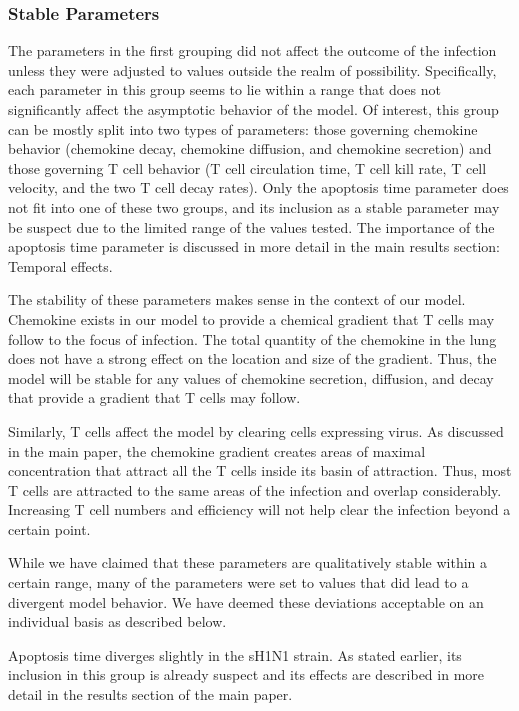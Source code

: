 \documentclass[10pt]{article}
\begin{document}
\subsubsection{Stable Parameters}

The parameters in the first grouping did not affect the outcome of the infection unless they were adjusted to values outside the realm of possibility.  Specifically, each parameter in this group seems to lie within a range that does not significantly affect the asymptotic behavior of the model.  Of interest, this group can be mostly split into two types of parameters: those governing chemokine behavior (chemokine decay, chemokine diffusion, and chemokine secretion) and those governing T cell behavior (T cell circulation time, T cell kill rate, T cell velocity, and the two T cell decay rates).  Only the apoptosis time parameter does not fit into one of these two groups, and its inclusion as a stable parameter may be suspect due to the limited range of the values tested.  The importance of the apoptosis time parameter is discussed in more detail in the main results section: Temporal effects.  

The stability of these parameters makes sense in the context of our model.  Chemokine exists in our model to provide a chemical gradient that T cells may follow to the focus of infection.  The total quantity of the chemokine in the lung does not have a strong effect on the location and size of the gradient.  Thus, the model will be stable for any values of chemokine secretion, diffusion, and decay that provide a gradient that T cells may follow.

Similarly, T cells affect the model by clearing cells expressing virus.  As discussed in the main paper, the chemokine gradient creates areas of maximal concentration that attract all the T cells inside its basin of attraction.  Thus, most T cells are attracted to the same areas of the infection and overlap considerably.  Increasing T cell numbers and efficiency will not help clear the infection beyond a certain point.

While we have claimed that these parameters are qualitatively stable within a certain range, many of the parameters were set to values that did lead to a divergent model behavior.  We have deemed these deviations acceptable on an individual basis as described below.

Apoptosis time diverges slightly in the sH1N1 strain.  As stated earlier, its inclusion in this group is already suspect and its effects are described in more detail in the results section of the main paper.
\end{document}
